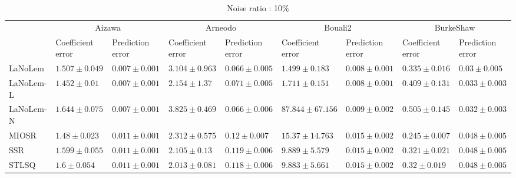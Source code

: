 \begin{table*}
\centering
\caption{Noise ratio : 10\%}
\label{}
\scalebox{0.7}
{
\begin{tabular}{lllllllll}
\toprule
 & \multicolumn{2}{c}{Aizawa} & \multicolumn{2}{c}{Arneodo} & \multicolumn{2}{c}{Bouali2} & \multicolumn{2}{c}{BurkeShaw} \\
 & Coefficient error & Prediction error & Coefficient error & Prediction error & Coefficient error & Prediction error & Coefficient error & Prediction error \\
\midrule
LaNoLem & $1.507\pm 0.049$ & $\mathbf{0.007}\pm 0.001$ & $3.104\pm 0.963$ & $0.066\pm 0.005$ & $\mathbf{1.499}\pm 0.183$ & $0.008\pm 0.001$ & $0.335\pm 0.016$ & $\mathbf{0.03}\pm 0.005$ \\
LaNoLem-L & $\mathbf{1.452}\pm 0.01$ & $0.007\pm 0.001$ & $2.154\pm 1.37$ & $0.071\pm 0.005$ & $1.711\pm 0.151$ & $\mathbf{0.008}\pm 0.001$ & $0.409\pm 0.131$ & $0.033\pm 0.003$ \\
LaNoLem-N & $1.644\pm 0.075$ & $0.007\pm 0.001$ & $3.825\pm 0.469$ & $\mathbf{0.066}\pm 0.006$ & $87.844\pm 67.156$ & $0.009\pm 0.002$ & $0.505\pm 0.145$ & $0.032\pm 0.003$ \\
MIOSR & $1.48\pm 0.023$ & $0.011\pm 0.001$ & $2.312\pm 0.575$ & $0.12\pm 0.007$ & $15.37\pm 14.763$ & $0.015\pm 0.002$ & $\mathbf{0.245}\pm 0.007$ & $0.048\pm 0.005$ \\
SSR & $1.599\pm 0.055$ & $0.011\pm 0.001$ & $2.105\pm 0.13$ & $0.119\pm 0.006$ & $9.889\pm 5.579$ & $0.015\pm 0.002$ & $0.321\pm 0.021$ & $0.048\pm 0.005$ \\
STLSQ & $1.6\pm 0.054$ & $0.011\pm 0.001$ & $\mathbf{2.013}\pm 0.081$ & $0.118\pm 0.006$ & $9.883\pm 5.661$ & $0.015\pm 0.002$ & $0.32\pm 0.019$ & $0.048\pm 0.005$ \\

\midrule


\end{tabular}}
\end{table*}
